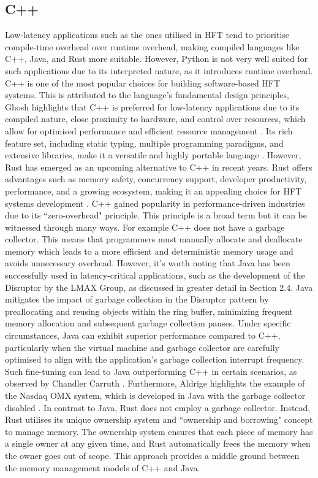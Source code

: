 \documentclass{article}
\theoremstyle{break}
\begin{document}
\subsection{C++}
Low-latency applications such as the ones utilised in HFT tend to prioritise compile-time overhead over runtime overhead, making compiled languages like C++, Java, and Rust more suitable. However, Python is not very well suited for such applications due to its interpreted nature, as it introduces runtime overhead. 
C++ is one of the most popular choices for building software-based HFT systems. This is attributed to the language's fundamental design principles, Ghosh highlights that C++ is preferred for low-latency applications due to its compiled nature, close proximity to hardware, and control over resources, which allow for optimised performance and efficient resource management \cite{Ghosh}. Its rich feature set, including static typing, multiple programming paradigms, and extensive libraries, make it a versatile and highly portable language \cite{14, 15}. However, Rust has emerged as an upcoming alternative to C++ in recent years. Rust offers advantages such as memory safety, concurrency support, developer productivity, performance, and a growing ecosystem, making it an appealing choice for HFT systems development \cite{11}. C++ gained popularity in performance-driven industries due to its ``zero-overhead" principle. This principle is a broad term but it can be witnessed through many ways. For example C++ does not have a garbage collector. This means that programmers must manually allocate and deallocate memory which leads to a more efficient and deterministic memory usage and avoids unnecessary overhead.
However, it's worth noting that Java has been successfully used in latency-critical applications, such as the development of the Disruptor by the LMAX Group, as discussed in greater detail in Section 2.4. Java mitigates the impact of garbage collection in the Disruptor pattern by preallocating and reusing objects within the ring buffer, minimizing frequent memory allocation and subsequent garbage collection pauses. Under specific circumstances, Java can exhibit superior performance compared to C++, particularly when the virtual machine and garbage collector are carefully optimised to align with the application's garbage collection interrupt frequency. Such fine-tuning can lead to Java outperforming C++ in certain scenarios, as observed by Chandler Carruth \cite{12}. Furthermore, Aldrige highlights the example of the Nasdaq OMX system, which is developed in Java with the garbage collector disabled \cite{2}. In contrast to Java, Rust does not employ a garbage collector. Instead, Rust utilises its unique ownership system and ``ownership and borrowing" concept to manage memory. The ownership system ensures that each piece of memory has a single owner at any given time, and Rust automatically frees the memory when the owner goes out of scope. This approach provides a middle ground between the memory management models of C++ and Java.
\end{document}
